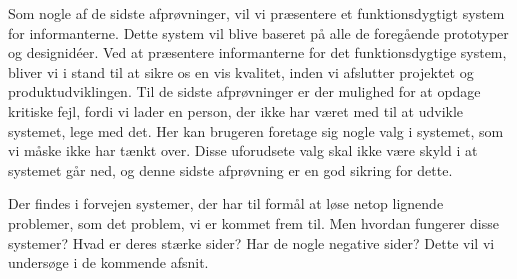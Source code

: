 Som nogle af de sidste afprøvninger, vil vi præsentere et funktionsdygtigt system for informanterne. Dette system vil blive baseret på alle de foregående prototyper og designidéer. Ved at præsentere informanterne for det funktionsdygtige system, bliver vi i stand til at sikre os en vis kvalitet, inden vi afslutter projektet og produktudviklingen. Til de sidste afprøvninger er der mulighed for at opdage kritiske fejl, fordi vi lader en person, der ikke har været med til at udvikle systemet, lege med det. Her kan brugeren foretage sig nogle valg i systemet, som vi måske ikke har tænkt over. Disse uforudsete valg skal ikke være skyld i at systemet går ned, og denne sidste afprøvning er en god sikring for dette. 

Der findes i forvejen systemer, der har til formål at løse netop lignende problemer, som det problem, vi er kommet frem til. Men hvordan fungerer disse systemer? Hvad er deres stærke sider? Har de nogle negative sider? Dette vil vi undersøge i de kommende afsnit.